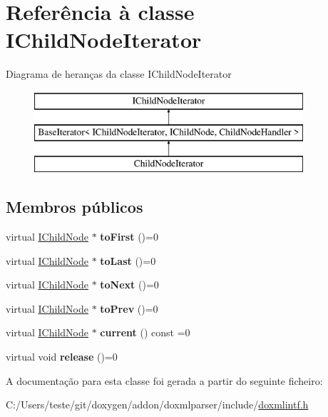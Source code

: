 \hypertarget{class_i_child_node_iterator}{\section{Referência à classe I\-Child\-Node\-Iterator}
\label{class_i_child_node_iterator}
}
Diagrama de heranças da classe I\-Child\-Node\-Iterator\begin{figure}[H]
\begin{center}
\leavevmode
\includegraphics[height=3.000000cm]{class_i_child_node_iterator}
\end{center}
\end{figure}
\subsection*{Membros públicos}
\begin{DoxyCompactItemize}
\item 
\hypertarget{class_i_child_node_iterator_a20044593fb3d2f2a74208cb4176dafdc}{virtual \hyperlink{class_i_child_node}{I\-Child\-Node} $\ast$ {\bfseries to\-First} ()=0}\label{class_i_child_node_iterator_a20044593fb3d2f2a74208cb4176dafdc}

\item 
\hypertarget{class_i_child_node_iterator_ad1964cf5ddaad40e39fe3efb81f4a131}{virtual \hyperlink{class_i_child_node}{I\-Child\-Node} $\ast$ {\bfseries to\-Last} ()=0}\label{class_i_child_node_iterator_ad1964cf5ddaad40e39fe3efb81f4a131}

\item 
\hypertarget{class_i_child_node_iterator_a1ad45145488731f9b2f056bfb52f7745}{virtual \hyperlink{class_i_child_node}{I\-Child\-Node} $\ast$ {\bfseries to\-Next} ()=0}\label{class_i_child_node_iterator_a1ad45145488731f9b2f056bfb52f7745}

\item 
\hypertarget{class_i_child_node_iterator_a2310b5dc8239d5e55533519643d24011}{virtual \hyperlink{class_i_child_node}{I\-Child\-Node} $\ast$ {\bfseries to\-Prev} ()=0}\label{class_i_child_node_iterator_a2310b5dc8239d5e55533519643d24011}

\item 
\hypertarget{class_i_child_node_iterator_a9895859a5f90f2437bc0943e38333d36}{virtual \hyperlink{class_i_child_node}{I\-Child\-Node} $\ast$ {\bfseries current} () const =0}\label{class_i_child_node_iterator_a9895859a5f90f2437bc0943e38333d36}

\item 
\hypertarget{class_i_child_node_iterator_aab0a52fdd148a54108e7bf49287d7c47}{virtual void {\bfseries release} ()=0}\label{class_i_child_node_iterator_aab0a52fdd148a54108e7bf49287d7c47}

\end{DoxyCompactItemize}


A documentação para esta classe foi gerada a partir do seguinte ficheiro\-:\begin{DoxyCompactItemize}
\item 
C\-:/\-Users/teste/git/doxygen/addon/doxmlparser/include/\hyperlink{include_2doxmlintf_8h}{doxmlintf.\-h}\end{DoxyCompactItemize}
